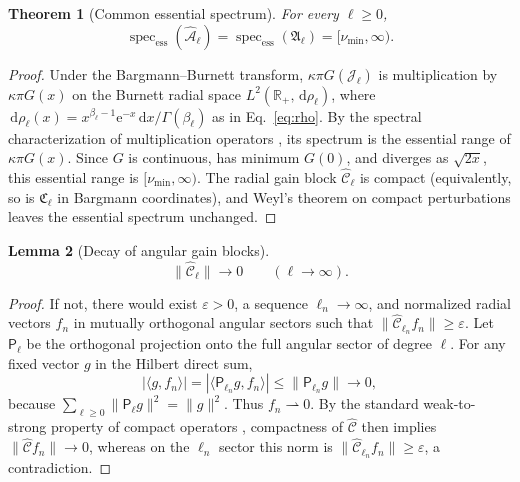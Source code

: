 \documentclass[11pt]{article}
\numberwithin{equation}{section}
\newcommand{\R}{\mathbb R}
\newcommand{\dd}{\,\mathrm d}
\newcommand{\specess}{\operatorname{spec}_{\mathrm{ess}}}
\newcommand{\e}{\mathrm e}
\newtheorem{theorem}{Theorem}[section]
\newtheorem{lemma}[theorem]{Lemma}
\theoremstyle{definition}
\begin{document}
\begin{theorem}[Common essential spectrum]\label{thm:common_essential}
For every $\ell\ge0$,
\begin{equation}
 \boxed{
 \specess(\widehat{\mathcal A}_\ell)
 =\specess(\mathfrak A_\ell)
 =
 [\nu_{\min},\infty).
 }
 \label{eq:ess}
\end{equation}
\end{theorem}

\begin{proof}
Under the Bargmann--Burnett transform,
$\kappa\pi G(\mathcal J_\ell)$ is multiplication by
$\kappa\pi G(x)$ on the Burnett radial space
$L^2(\R_+,\dd\rho_\ell)$, where
$\dd\rho_\ell(x)=x^{\beta_\ell-1}\e^{-x}\dd x/\Gamma(\beta_\ell)$ as in
Eq.~\eqref{eq:rho}.  By the spectral characterization of multiplication
operators \cite{ReedSimon1980}, its spectrum is the essential range of
$\kappa\pi G(x)$.  Since $G$ is continuous, has minimum $G(0)$, and diverges
as $\sqrt{2x}$, this essential range is $[\nu_{\min},\infty)$.  The
radial gain block $\widehat{\mathcal C}_\ell$ is compact (equivalently,
so is $\mathfrak C_\ell$ in Bargmann coordinates), and Weyl's theorem on compact perturbations \cite{ReedSimon1980} leaves
the essential spectrum unchanged.
\end{proof}

\begin{lemma}[Decay of angular gain blocks]
\begin{equation}
 \|\widehat{\mathcal C}_\ell\|\longrightarrow0
 \qquad(\ell\to\infty).
 \label{eq:Cldecay}
\end{equation}
\end{lemma}

\begin{proof}
If not, there would exist $\varepsilon>0$, a sequence
$\ell_n\to\infty$, and normalized radial vectors $f_n$ in mutually orthogonal
angular sectors such that
$\|\widehat{\mathcal C}_{\ell_n}f_n\|\ge\varepsilon$.  Let $\mathsf P_\ell$ be the
orthogonal projection onto the full angular sector of degree $\ell$.  For any
fixed vector $g$ in the Hilbert direct sum,
\begin{equation}
 |\langle g,f_n\rangle|
 =|\langle \mathsf P_{\ell_n}g,f_n\rangle|
 \le \|\mathsf P_{\ell_n}g\|\longrightarrow0,
\end{equation}
because $\sum_{\ell\ge0}\|\mathsf P_\ell g\|^2=\|g\|^2$.  Thus
$f_n\rightharpoonup0$.  By the standard weak-to-strong property of compact
operators \cite{ReedSimon1980}, compactness of $\widehat{\mathcal C}$ then implies
$\|\widehat{\mathcal C}f_n\|\to0$, whereas on the $\ell_n$ sector this norm is
$\|\widehat{\mathcal C}_{\ell_n}f_n\|\ge\varepsilon$, a contradiction.
\end{proof}
\end{document}
